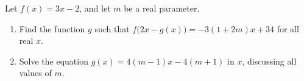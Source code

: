Let $f(x)=3x-2$, and let $m$ be a real parameter.
\begin{enumerate}
\item[(a)] Find the function $g$ such that $f\bigl(2x-g(x)\bigr)=-3(1+2m)x+34$ for all real $x$.
\item[(b)] Solve the equation $g(x)=4(m-1)x-4(m+1)$ in $x$, discussing all values of $m$.
\end{enumerate}
